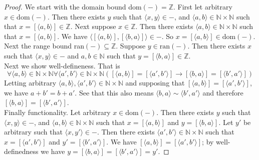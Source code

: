 \documentclass{report}
\begin{document}
\begin{proof}
We start with the domain bound dom$(-)=\mathbb Z$. First let arbitrary $x\in\text{dom}(-)$. Then there exists $y$ such that $\langle x,y\rangle\in-$, and 
$\langle a,b\rangle\in\mathbb N\times\mathbb N$ such that $x=[\langle a,b\rangle]\in\mathbb Z$.
Next suppose $x\in\mathbb Z$. Then there exists $\langle a,b\rangle\in\mathbb N\times\mathbb N$ such that $x=[\langle a,b\rangle]$. 
We have $\langle[\langle a,b\rangle],[\langle b,a\rangle]\rangle\in-$. So $x=[\langle a,b\rangle]\in\text{dom}(-)$.\\
\indent Next the range bound ran$(-)\subseteq\mathbb Z$. Suppose $y\in\text{ran}(-)$. Then there exists $x$ such that $\langle x,y\rangle\in-$ and $a,b\in\mathbb N$ such that $y=[\langle b,a\rangle]\in\mathbb Z$.\\
\indent Next we show well-defineness. That is
\begin{equation*}
\forall\langle a,b\rangle\in\mathbb N\times\mathbb N\forall\langle a',b'\rangle\in\mathbb N\times\mathbb N([\langle a,b\rangle]=[\langle a',b'\rangle]\to
[\langle b,a\rangle]=[\langle b',a'\rangle])
\end{equation*}
Letting arbitrary $\langle a,b\rangle,\langle a',b'\rangle\in\mathbb N\times\mathbb N$ and supposing that $[\langle a,b\rangle]=[\langle a',b'\rangle]$,
we have $a+b'=b+a'$. See that this also means $\langle b,a\rangle\sim\langle b',a'\rangle$ and therefore $[\langle b,a\rangle]=[\langle b',a'\rangle]$.\\
\indent Finally functionality. Let arbitrary $x\in\text{dom}(-)$. Then there exists $y$ such that $\langle x,y\rangle\in-$, and $\langle a,b\rangle\in\mathbb N\times\mathbb N$ such that
$x=[\langle a,b\rangle]$ and $y=[\langle b,a\rangle]$.
Let $y'$ be arbitrary such that $\langle x,y'\rangle\in-$. Then there exists 
$\langle a',b'\rangle\in\mathbb N\times\mathbb N$ such that
$x=[\langle a',b'\rangle]$ and $y'=[\langle b',a'\rangle]$. We have $[\langle a,b\rangle]=[\langle a',b'\rangle]$; by well-definedness we have $y=[\langle b,a\rangle]=[\langle b',a'\rangle]=y'$.
\end{proof}
\newpage
\end{document}
